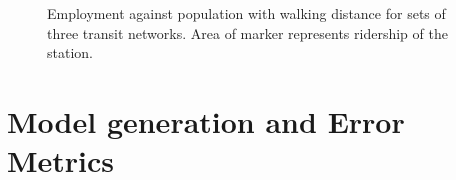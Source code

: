 \documentclass[11pt]{article}
\begin{document}
\begin{figure}
\centering
{}

\vspace{-15pt}
\captionsetup{singlelinecheck=off, justification=centering}
\caption[]{Employment against population with walking distance for sets of three transit networks.\linebreak
Area of marker represents ridership of the station.}\label{fig:networkvars}
\end{figure}




\section{Model generation and Error Metrics}
\end{document}
